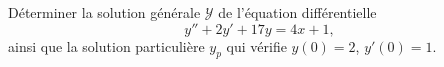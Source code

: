 
\begin{exercice}\label{exosession2-0005}

Déterminer la solution générale $\mathcal{Y}$ de l'équation différentielle 
\begin{equation*}
  y''+2y'+17y = 4x+1,
\end{equation*}
ainsi que la solution particulière $y_p$ qui vérifie $y(0) = 2$, $y'(0)=1$.

\end{exercice}

